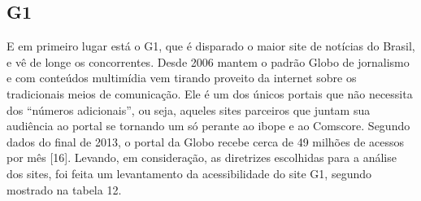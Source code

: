 \documentclass[a4paper]{article}
\begin{document}
\begin{titlepage}
\subsection{G1}

E em primeiro lugar está o G1, que é disparado o maior site de notícias do Brasil, e vê de longe os concorrentes. Desde 2006 mantem o padrão Globo de jornalismo e com conteúdos multimídia vem tirando proveito da internet sobre os tradicionais meios de comunicação. Ele é um dos únicos portais que não necessita dos “números adicionais”, ou seja, aqueles sites parceiros que juntam sua audiência ao portal se tornando um só perante ao ibope e ao Comscore. Segundo dados do final de 2013, o portal da Globo recebe cerca de 49 milhões de acessos por mês [16]. Levando, em consideração, as diretrizes escolhidas para a análise dos sites, foi feita um levantamento da acessibilidade do site G1, segundo mostrado na tabela 12.\\


\end{titlepage}
\end{document}
